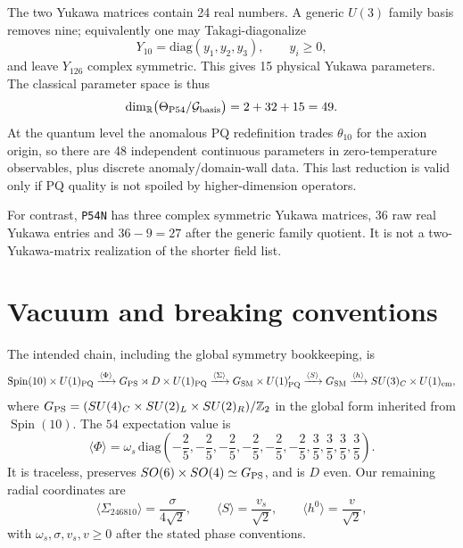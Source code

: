 \documentclass[11pt]{article}
\newcommand{\Spin}{\operatorname{Spin}}
\newcommand{\PS}{G_{\rm PS}}
\newcommand{\SM}{G_{\rm SM}}
\newcommand{\ThetaP}{\Theta_{\rm P54}}
\begin{document}
The two Yukawa matrices contain 24 real numbers.  A generic $U(3)$ family
basis removes nine; equivalently one may Takagi-diagonalize
\begin{equation}
 Y_{10}=\mathrm{diag}(y_1,y_2,y_3),\qquad y_i\ge0,
\end{equation}
and leave $Y_{126}$ complex symmetric.  This gives 15 physical Yukawa
parameters.  The classical parameter space is thus
\begin{equation}
 \dim_{\mathbb R}\bigl(\ThetaP/\mathcal G_{\rm basis}\bigr)
 =2+32+15=49.
 \label{eq:classicalcount}
\end{equation}
At the quantum level the anomalous PQ redefinition trades $\theta_{10}$ for
the axion origin, so there are 48 independent continuous parameters in
zero-temperature observables, plus discrete anomaly/domain-wall data.  This
last reduction is valid only if PQ quality is not spoiled by higher-dimension
operators.

For contrast, \texttt{P54N} has three complex symmetric Yukawa matrices,
36 raw real Yukawa entries and $36-9=27$ after the generic family quotient.
It is not a two-Yukawa-matrix realization of the shorter field list.

\section{Vacuum and breaking conventions}

The intended chain, including the global symmetry bookkeeping, is
\begin{equation}
 \Spin(10)\times U(1)_{\rm PQ}
 \xrightarrow{\langle\Phi\rangle}
 \PS\rtimes D\times U(1)_{\rm PQ}
 \xrightarrow{\langle\Sigma\rangle}
 \SM\times U(1)'_{\rm PQ}
 \xrightarrow{\langle S\rangle}\SM
 \xrightarrow{\langle h\rangle}SU(3)_C\times U(1)_{\rm em},
 \label{eq:chain}
\end{equation}
where $\PS=(SU(4)_C\times SU(2)_L\times SU(2)_R)/\mathbb Z_2$ in the
global form inherited from $\Spin(10)$.  The $54$ expectation value is
\begin{equation}
 \langle\Phi\rangle=\omega_s\,
 \mathrm{diag}\left(
 -\frac25,-\frac25,-\frac25,-\frac25,-\frac25,-\frac25,
 \frac35,\frac35,\frac35,\frac35\right).
 \label{eq:54vev}
\end{equation}
It is traceless, preserves $SO(6)\times SO(4)\simeq\PS$, and is $D$ even.
Our remaining radial coordinates are
\begin{equation}
 \langle\Sigma_{246810}\rangle=\frac{\sigma}{4\sqrt2},
 \qquad \langle S\rangle=\frac{v_s}{\sqrt2},
 \qquad \langle h^0\rangle=\frac{v}{\sqrt2},
 \label{eq:othervevs}
\end{equation}
with $\omega_s,\sigma,v_s,v\ge0$ after the stated phase conventions.
\end{document}
